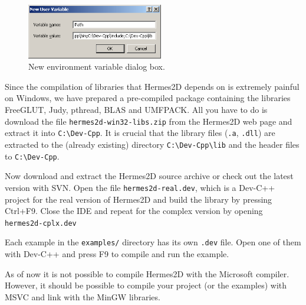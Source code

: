 \begin{figure}[ht]
  \medskip \centering
  \includegraphics[width=0.53\textwidth]{img/win-env.png}
  \caption{New environment variable dialog box.}
  \label{fig:win-env}
\end{figure}

Since the compilation of libraries that Hermes2D depends on is extremely painful on Windows,
we have prepared a pre-compiled package containing the libraries FreeGLUT, Judy, pthread,
BLAS and UMFPACK. All you have to do is download the file {\tt hermes2d-win32-libs.zip}
from the Hermes2D web page and extract it into \verb"C:\Dev-Cpp". It is crucial that the library
files ({\tt *.a}, {\tt *.dll}) are extracted to the (already existing) directory
\verb"C:\Dev-Cpp\lib" and the header files to \verb"C:\Dev-Cpp".

Now download and extract the Hermes2D source archive or check out the latest version with SVN.
Open the file {\tt hermes2d-real.dev}, which is a Dev-C++ project for the real version of Hermes2D
and build the library by pressing Ctrl+F9. Close the IDE and repeat for the complex version
by opening {\tt hermes2d-cplx.dev}

Each example in the {\tt examples/} directory has its own {\tt .dev} file. Open one of them with
Dev-C++ and press F9 to compile and run the example.

As of now it is not possible to compile Hermes2D with the Microsoft compiler. However, it should
be possible to compile your project (or the examples) with MSVC and link with the MinGW libraries.

\newpage
